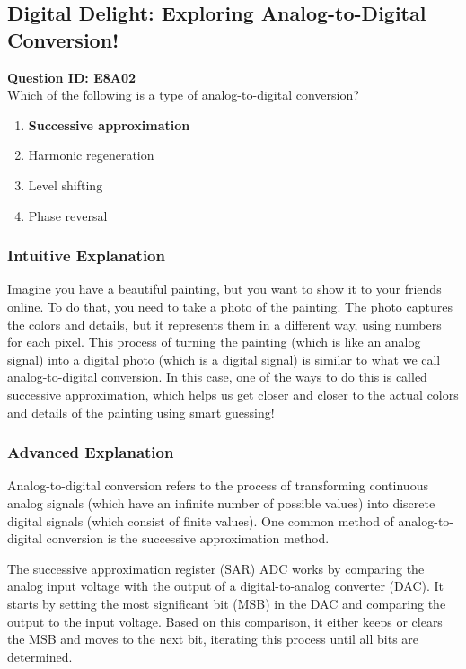 \subsection{Digital Delight: Exploring Analog-to-Digital Conversion!}

\begin{tcolorbox}
    \textbf{Question ID: E8A02} \\
    Which of the following is a type of analog-to-digital conversion? \\
    \begin{enumerate}[label=\Alph*.]
        \item \textbf{Successive approximation}
        \item Harmonic regeneration
        \item Level shifting
        \item Phase reversal
    \end{enumerate}
\end{tcolorbox}

\subsubsection{Intuitive Explanation}
Imagine you have a beautiful painting, but you want to show it to your friends online. To do that, you need to take a photo of the painting. The photo captures the colors and details, but it represents them in a different way, using numbers for each pixel. This process of turning the painting (which is like an analog signal) into a digital photo (which is a digital signal) is similar to what we call analog-to-digital conversion. In this case, one of the ways to do this is called successive approximation, which helps us get closer and closer to the actual colors and details of the painting using smart guessing!

\subsubsection{Advanced Explanation}
Analog-to-digital conversion refers to the process of transforming continuous analog signals (which have an infinite number of possible values) into discrete digital signals (which consist of finite values). One common method of analog-to-digital conversion is the successive approximation method.

The successive approximation register (SAR) ADC works by comparing the analog input voltage with the output of a digital-to-analog converter (DAC). It starts by setting the most significant bit (MSB) in the DAC and comparing the output to the input voltage. Based on this comparison, it either keeps or clears the MSB and moves to the next bit, iterating this process until all bits are determined.

